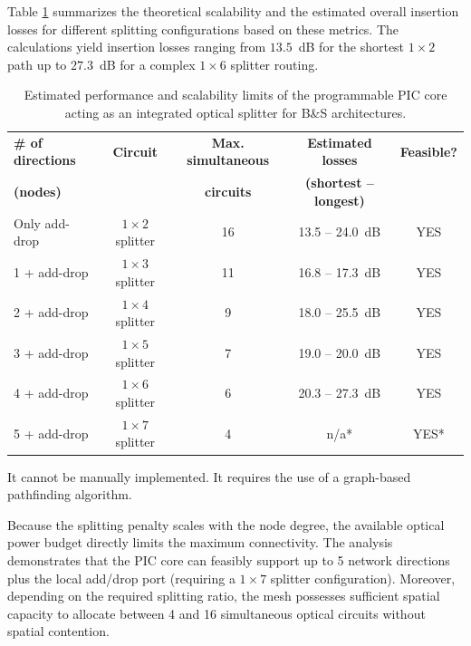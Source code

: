 Table \ref{tab:ch5-bs_scalability} summarizes the theoretical scalability and the estimated overall 
insertion losses for different splitting configurations based on these metrics. The calculations 
yield insertion losses ranging from $13.5$~dB for the shortest $1\times 2$ path up to $27.3$~dB for 
a complex $1\times 6$ splitter routing. 

\begin{table}[htpb]
    \centering
    \caption{Estimated performance and scalability limits of the programmable PIC core acting as an 
    integrated optical splitter for B\&S architectures.}
    \label{tab:ch5-bs_scalability}
    \renewcommand{\arraystretch}{1.2}
    \begin{tabular}{lcccc}
        \hline
        \textbf{\# of directions} & \textbf{Circuit} & \textbf{Max. simultaneous} & 
        \textbf{Estimated losses} & \textbf{Feasible?} \\
        \textbf{(nodes)} & & \textbf{circuits} & \textbf{(shortest -- longest)} & \\
        \hline
        Only add-drop & $1\times2$ splitter & 16 & 13.5 -- 24.0~dB & YES \\
        1 + add-drop  & $1\times3$ splitter & 11 & 16.8 -- 17.3~dB & YES \\
        2 + add-drop  & $1\times4$ splitter & 9  & 18.0 -- 25.5~dB & YES \\
        3 + add-drop  & $1\times5$ splitter & 7  & 19.0 -- 20.0~dB & YES \\
        4 + add-drop  & $1\times6$ splitter & 6  & 20.3 -- 27.3~dB & YES \\
        5 + add-drop  & $1\times7$ splitter & 4  & n/a*            & YES* \\
        \hline
    \end{tabular}
    \vspace{0.15cm}
    \parbox{\textwidth}{\footnotesize *It cannot be manually implemented. It 
    requires the use of a graph-based pathfinding algorithm.}
\end{table}

Because the splitting penalty scales with the node degree, 
the available optical power budget directly limits the maximum connectivity. The analysis 
demonstrates that the PIC core can feasibly support up to 5 network directions plus the local 
add/drop port (requiring a $1\times 7$ splitter configuration). Moreover, depending on the required 
splitting ratio, the mesh possesses sufficient spatial capacity to allocate between 4 and 16 
simultaneous optical circuits without spatial contention.

